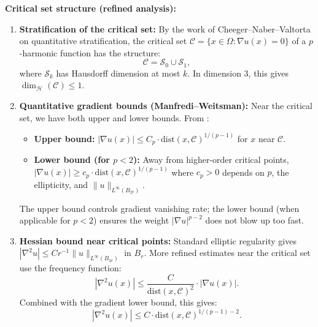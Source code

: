 \textbf{Critical set structure (refined analysis):}
\begin{enumerate}
    \item \textbf{Stratification of the critical set:} By the work of Cheeger--Naber--Valtorta \cite{cheegernabervaltorta2015} on quantitative stratification, the critical set $\mathcal{C} = \{x \in \Omega : \nabla u(x) = 0\}$ of a $p$-harmonic function has the structure:
    \begin{equation}
        \mathcal{C} = \mathcal{S}_0 \cup \mathcal{S}_1,
    \end{equation}
    where $\mathcal{S}_k$ has Hausdorff dimension at most $k$. In dimension 3, this gives $\dim_{\mathcal{H}}(\mathcal{C}) \le 1$.
    
    \item \textbf{Quantitative gradient bounds (Manfredi--Weitsman):} Near the critical set, we have both upper and lower bounds. From \cite{manfredi1988}:
    \begin{itemize}
        \item \textbf{Upper bound:} $|\nabla u(x)| \le C_p \cdot \text{dist}(x, \mathcal{C})^{1/(p-1)}$ for $x$ near $\mathcal{C}$.
        \item \textbf{Lower bound (for $p < 2$):} Away from higher-order critical points, $|\nabla u(x)| \ge c_p \cdot \text{dist}(x, \mathcal{C})^{1/(p-1)}$ where $c_p > 0$ depends on $p$, the ellipticity, and $\|u\|_{L^\infty(B_{2r})}$.
    \end{itemize}
    The upper bound controls gradient vanishing rate; the lower bound (when applicable for $p < 2$) ensures the weight $|\nabla u|^{p-2}$ does not blow up too fast.
    
    \item \textbf{Hessian bound near critical points:} Standard elliptic regularity gives $|\nabla^2 u| \le C r^{-1} \|u\|_{L^\infty(B_{2r})}$ in $B_r$. More refined estimates near the critical set use the frequency function:
    \begin{equation}
        |\nabla^2 u(x)| \le \frac{C}{\text{dist}(x, \mathcal{C})^2} \cdot |\nabla u(x)|.
    \end{equation}
    Combined with the gradient lower bound, this gives:
    \begin{equation}
        |\nabla^2 u(x)| \le C \cdot \text{dist}(x, \mathcal{C})^{1/(p-1) - 2}.
    \end{equation}
    

\end{enumerate}
